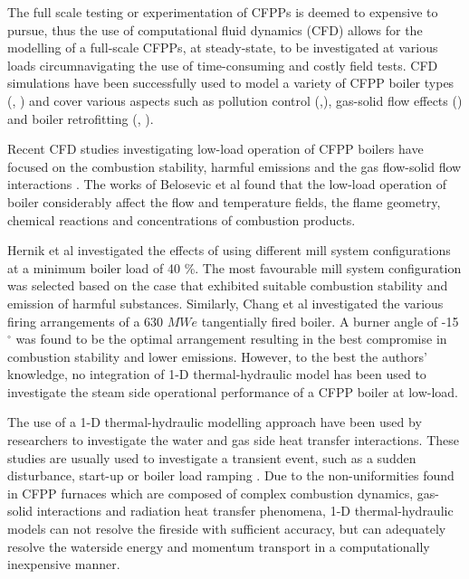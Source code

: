 \documentclass[review]{elsarticle}
\begin{document}
The full scale testing or experimentation of CFPPs is deemed to expensive to pursue, thus the use of computational fluid dynamics (CFD) allows for the modelling of a full-scale CFPPs, at steady-state, to be investigated at various loads circumnavigating the use of time-consuming and costly field tests. CFD simulations have been successfully used to model a variety of CFPP boiler types (\cite{Laubscher2019a}, \cite{Gu2020}) and cover various aspects such as pollution control (\cite{Du2017},\cite{Fan2001}), gas-solid flow effects (\cite{Chen2017}) and boiler retrofitting (\citep{Gu2020}, \cite{He2007}).

Recent CFD studies investigating low-load operation of CFPP boilers have focused on the combustion stability, harmful emissions and the gas flow-solid flow interactions \cite{Jiang2021}. The works of Belosevic et al \citep{Belosevic2019a} found that the low-load operation of boiler considerably affect the flow and temperature fields, the flame geometry, chemical reactions and concentrations of combustion products.

Hernik et al \cite{Hernik2020} investigated the effects of using different mill system configurations at a minimum boiler load of 40 \%. The most favourable mill system configuration was selected based on the case that exhibited suitable combustion stability and emission of harmful substances. Similarly, Chang et al \citep{Chang2021} investigated the various firing arrangements of a 630 $MWe$ tangentially fired boiler. A burner angle of -15 $^\circ$ was found to be the optimal arrangement resulting in the best compromise in combustion stability and lower emissions. However, to the best the authors' knowledge, no integration of 1-D thermal-hydraulic model has been used to investigate the steam side operational performance of a CFPP boiler at low-load.

The use of a 1-D thermal-hydraulic modelling approach have been used by researchers to investigate the water and gas side heat transfer interactions. These studies are usually used to investigate a transient event, such as a sudden disturbance, start-up or boiler load ramping \cite{Alobaid2017}. Due to the non-uniformities found in CFPP furnaces which are composed of complex combustion dynamics, gas-solid interactions and  radiation heat transfer phenomena, 1-D thermal-hydraulic models can not resolve the fireside with sufficient accuracy, but can adequately resolve the waterside energy and momentum transport in a computationally inexpensive manner. 
\end{document}
